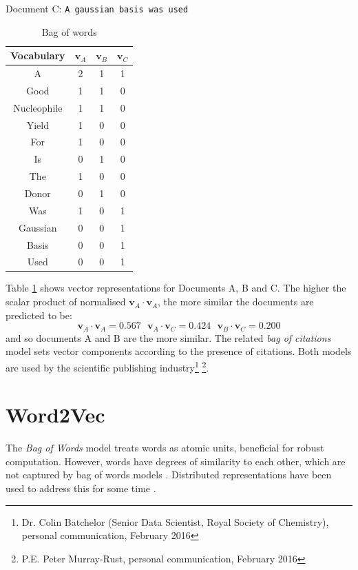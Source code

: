 Document C: \texttt{A gaussian basis was used}
\begin{table}[H]
\caption{Bag of words}
\label{tab:BAGOFWORDS}
\begin{center}
\begin{tabular}{||c|c|c|c||}
\hline
Vocabulary &  $\mathbf{v}_A$ & $\mathbf{v}_B$ & $\mathbf{v}_C$\\
\hline
A & 2 & 1 & 1\\
Good & 1 & 1 & 0\\
Nucleophile & 1 & 1 & 0 \\
Yield & 1 & 0 & 0\\
For & 1& 0 & 0\\
Is & 0 & 1 & 0\\
The & 1 & 0 & 0\\
Donor & 0 & 1 & 0\\
Was & 1 & 0 & 1\\
Gaussian & 0 & 0 & 1\\
Basis & 0 & 0 & 1\\
Used & 0 & 0 & 1\\
\hline
\end{tabular}
\end{center}
\end{table}
Table \ref{tab:BAGOFWORDS} shows vector representations for Documents A, B and C. The higher the scalar product of normalised $\mathbf{v}_A \cdot \mathbf{v}_A$, the more similar the documents are predicted to be:
 $$\mathbf{v}_A \cdot \mathbf{v}_A = 0.567 \ \ \ \mathbf{v}_A \cdot \mathbf{v}_C = 0.424 \ \ \ \mathbf{v}_B \cdot \mathbf{v}_C=0.200$$ 
and so documents A and B are the more similar.
The related \emph{bag of citations} model sets vector components according to the presence of citations. Both models are used by the scientific publishing industry\footnote{Dr. Colin Batchelor  (Senior Data Scientist, Royal Society of Chemistry), personal communication, February 2016} \footnote{P.E. Peter Murray-Rust, personal communication, February 2016}.
\section{Word2Vec}
\label{sec:WORD2VEC}
The \emph{Bag of Words} model treats words as atomic units, beneficial for robust computation. However, words have degrees of similarity to each other, which are not captured by bag of words models \cite{word2veckingqueen}. Distributed representations have been used to address this for some time \cite{distributedrepresentations}.

